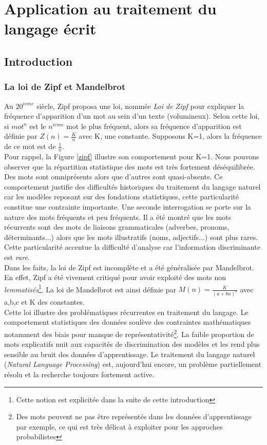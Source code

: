 \section{Application au traitement du langage écrit}
\subsection{Introduction}
\subsubsection{La loi de Zipf et Mandelbrot}
Au $20^{ieme}$ siècle, Zipf proposa une loi, nommée \textit{Loi de Zipf} pour expliquer la fréquence d'apparition d'un mot au sein d'un texte (volumineux). Selon cette loi, si $mot^n$ est le $n^{ieme}$ mot le plus fréquent, alors sa fréquence d'apparition est définie par $Z(n)=\frac{K}{n}$ avec K, une constante. Supposons K=1, alors la fréquence de ce mot est de $\frac{1}{n}$.\\

\noindent Pour rappel, la Figure \ref{zipf} illustre son comportement pour K=1. Nous pouvons observer que la répartition statistique des mots est très fortement déséquilibrée. Des mots sont omniprésents alors que d'autres sont quasi-absents. Ce comportement justifie des difficultés historiques du traitement du langage naturel car les modèles reposant sur des fondations statistiques, cette particularité constitue une contrainte importante. Une seconde interrogation se porte sur la nature des mots fréquents et peu fréquents. Il a été montré que les mots récurrents sont des mots de liaisons grammaticales (adverbes, pronoms, déterminants...) alors que les mots illustratifs (noms, adjectifs...) sont plus rares. Cette particularité accentue la difficulté d'analyse car l'information discriminante est \textit{rare}.\\

\noindent Dans les faits, la loi de Zipf est incomplète et a été généralisée par Mandelbrot. En effet, Zipf a été vivement critiqué pour avoir exploité des mots non \textit{lemmatisés}\footnote{Cette notion est explicitée dans la suite de cette introduction}. La loi de Mandelbrot est ainsi définie par $M(n)=\frac{K}{(a+bn)^{c}}$ avec a,b,c et K des constantes.\\

\noindent Cette loi illustre des problématiques récurrentes en traitement du langage. Le comportement statistiques des données soulève des contraintes mathématiques notamment des biais pour manque de représentativité\footnote{Des mots peuvent ne pas être représentés dans les données d'apprentissage par exemple, ce qui est très délicat à exploiter pour les approches probabilistes}. La faible proportion de mots explicatifs nuit aux capacités de discrimination des modèles et les rend plus sensible au bruit des données d'apprentissage. Le traitement du langage naturel (\textit{Natural Language Processing}) est, aujourd'hui encore, un problème partiellement résolu et la recherche toujours fortement active.

